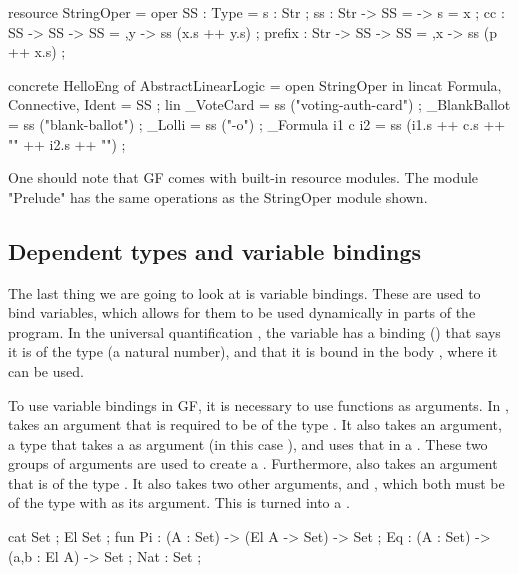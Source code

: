 \begin{lstgf}
resource StringOper = {
    oper
        SS : Type = {s : Str} ;
        ss : Str -> SS = \x -> {s = x} ;
        cc : SS -> SS -> SS = \x,y -> ss (x.s ++ y.s) ;
        prefix : Str -> SS -> SS = \p,x -> ss (p ++ x.s) ;
}
\end{lstgf}

\begin{lstgf}
concrete HelloEng of AbstractLinearLogic = open StringOper in {
    lincat 
        Formula, Connective, Ident = SS ;
    lin 
        _VoteCard = ss ("voting-auth-card") ;
        _BlankBallot = ss ("blank-ballot") ;
        _Lolli = ss ("-o") ;
        _Formula i1 c i2 = ss (i1.s ++ c.s ++ "{" ++ i2.s ++ "}") ;
}
\end{lstgf}

One should note that GF comes with built-in resource modules. The module "Prelude" has the same operations as the StringOper module shown.

\subsection{Dependent types and variable bindings}
\label{03_02_04}

The last thing we are going to look at is variable bindings. These are used to bind variables, which allows for them to be used dynamically in parts of the program. In the universal quantification , the variable  has a binding () that says it is of the type  (a natural number), and that it is bound in the body , where it can be used.

To use variable bindings in GF, it is necessary to use functions as arguments. In ,  takes an argument  that is required to be of the type . It also takes an  argument, a type that takes a  as argument (in this case ), and uses that in a . These two groups of arguments are used to create a . Furthermore,  also takes an argument  that is of the type . It also takes two other arguments,  and , which both must be of the type  with  as its argument. This is turned into a .


\begin{lstgf}
    cat
        Set ;
        El Set ;
    fun
        Pi : (A : Set) -> (El A -> Set) -> Set ;
        Eq : (A : Set) -> (a,b : El A) -> Set ;
        Nat : Set ;
\end{lstgf}

